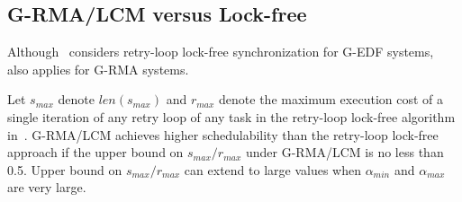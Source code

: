 \subsection{G-RMA/LCM versus Lock-free}\label{g-rma lcm vs lock-free}

Although~\cite{key-5} considers retry-loop lock-free synchronization
for G-EDF systems,~\cite{key-5} also applies for G-RMA systems.

\begin{clm}\label{lcm rma lock-free comparison clm}

Let $s_{max}$ denote $len(s_{max})$ and $r_{max}$ denote the maximum
execution cost of a single iteration of any retry loop of any task
in the retry-loop lock-free algorithm in~\cite{key-5}. G-RMA/LCM
achieves higher schedulability than the retry-loop lock-free approach
if the upper bound on $s_{max}/r_{max}$ under G-RMA/LCM is no less
than 0.5. Upper bound on $s_{max}/r_{max}$ can extend to large values
when $\alpha_{min}$ and $\alpha_{max}$ are very large.

\end{clm}

